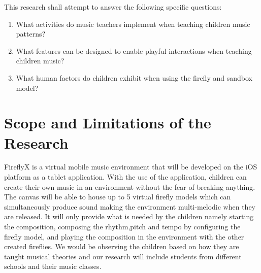 %
%
This research shall attempt to answer the following specific questions:
\begin{enumerate}
\item What activities do music teachers implement when teaching children music patterns?
\item What features can be designed to enable playful interactions when teaching children music?
\item What human factors do children exhibit when using the firefly and sandbox model?
\end{enumerate}


\section{Scope and Limitations of the Research}
\label{sec:scopelimitations}

    FireflyX is a virtual mobile music environment that will be developed on the iOS platform as a tablet application. With the use of the application, children can create their own music in an environment without the fear of breaking anything. The canvas will be able to house up to 5 virtual firefly models which can simultaneously produce sound making the environment multi-melodic when they are released. It will only provide what is needed by the children namely starting the composition, composing the rhythm,pitch and tempo by configuring the firefly model, and playing the composition in the environment with the other created fireflies. We would be observing the children based on how they are taught musical theories and our research will include students from different schools and their music classes.
    

